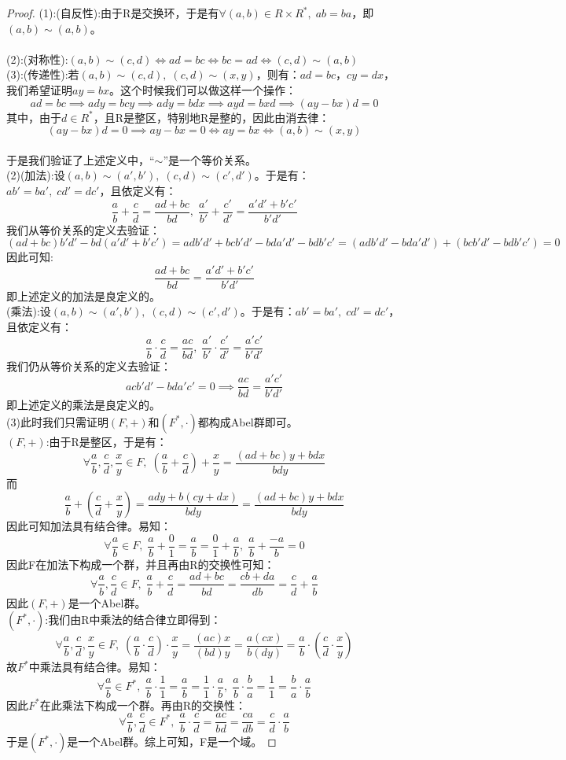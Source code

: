 \begin{proof}
(1):(自反性):由于R是交换环，于是有$\forall (a,b)\in R\times R^*,\; ab=ba$，即$(a,b)\sim (a,b)$。\\
\\
(2):(对称性):$(a,b)\sim (c,d)\iff ad=bc\iff bc=ad \iff (c,d)\sim (a,b)$\\
(3):(传递性):若$(a,b)\sim (c,d),\; (c,d)\sim (x,y)$，则有：$ad=bc$，$cy=dx$，我们希望证明$ay=bx$。这个时候我们可以做这样一个操作：
\[
ad=bc\implies ady=bcy\implies ady=bdx \implies ayd=bxd\implies (ay-bx)d=0
\]
其中，由于$d\in R^*$，且R是整区，特别地R是整的，因此由消去律：
\[
(ay-bx)d=0\implies ay-bx=0\iff ay=bx\iff (a,b)\sim(x,y)
\]
\\
于是我们验证了上述定义中，“$\sim$”是一个等价关系。\\
(2)(加法):设$(a,b)\sim (a',b'),\; (c,d)\sim (c',d')$。于是有：$ab'=ba',\; cd'=dc'$，且依定义有：
\[
\frac{a}{b}+\frac{c}{d}=\frac{ad+bc}{bd},\; \frac{a'}{b'}+\frac{c'}{d'}=\frac{a'd'+b'c'}{b'd'}
\]
我们从等价关系的定义去验证：
\[
(ad+bc)b'd'-bd(a'd'+b'c')=adb'd'+bcb'd'-bda'd'-bdb'c'=(adb'd'-bda'd')+(bcb'd'-bdb'c')=0
\]
因此可知:
\[
\frac{ad+bc}{bd}=\frac{a'd'+b'c'}{b'd'}
\]
即上述定义的加法是良定义的。\\
(乘法):设$(a,b)\sim (a',b'),\; (c,d)\sim (c',d')$。于是有：$ab'=ba',\; cd'=dc'$，且依定义有：
\[
\frac{a}{b}\cdot \frac{c}{d}=\frac{ac}{bd},\; \frac{a'}{b'}\cdot \frac{c'}{d'}=\frac{a'c'}{b'd'}
\]
我们仍从等价关系的定义去验证：
\[
acb'd'-bda'c'=0\implies \frac{ac}{bd}=\frac{a'c'}{b'd'}
\]
即上述定义的乘法是良定义的。\\
(3)此时我们只需证明$(F,+)$和$(F^*,\cdot)$都构成Abel群即可。\\
$(F,+)$:由于R是整区，于是有：
\[
\forall \frac{a}{b},\frac{c}{d},\frac{x}{y}\in F,\; (\frac{a}{b}+\frac{c}{d})+\frac{x}{y}=\frac{(ad+bc)y+bdx}{bdy}
\]
而
\[
\frac{a}{b}+(\frac{c}{d}+\frac{x}{y})=\frac{ady+b(cy+dx)}{bdy}=\frac{(ad+bc)y+bdx}{bdy}
\]
因此可知加法具有结合律。易知：
\[
\forall \frac{a}{b}\in F,\; \frac{a}{b}+\frac{0}{1}=\frac{a}{b}=\frac{0}{1}+\frac{a}{b},\; \frac{a}{b}+\frac{-a}{b}=0
\]
因此F在加法下构成一个群，并且再由R的交换性可知：
\[
\forall \frac{a}{b},\frac{c}{d}\in F,\; \frac{a}{b}+\frac{c}{d}=\frac{ad+bc}{bd}=\frac{cb+da}{db}=\frac{c}{d}+\frac{a}{b}
\]
因此$(F,+)$是一个Abel群。\\
$(F^*,\cdot)$:我们由R中乘法的结合律立即得到：
\[
\forall \frac{a}{b},\frac{c}{d},\frac{x}{y}\in F,\;(\frac{a}{b}\cdot\frac{c}{d})\cdot\frac{x}{y}=\frac{(ac)x}{(bd)y}=\frac{a(cx)}{b(dy)}=\frac{a}{b}\cdot (\frac{c}{d}\cdot \frac{x}{y})
\]
故$F^*$中乘法具有结合律。易知：
\[
\forall \frac{a}{b}\in F^*,\; \frac{a}{b}\cdot \frac{1}{1}=\frac{a}{b}=\frac{1}{1}\cdot\frac{a}{b},\; \frac{a}{b}\cdot \frac{b}{a}=\frac{1}{1}=\frac{b}{a}\cdot\frac{a}{b}
\]
因此$F^*$在此乘法下构成一个群。再由R的交换性：
\[
\forall \frac{a}{b},\frac{c}{d}\in F^*,\; \frac{a}{b}\cdot \frac{c}{d}=\frac{ac}{bd}=\frac{ca}{db}=\frac{c}{d}\cdot\frac{a}{b}
\]
于是$(F^*,\cdot)$是一个Abel群。综上可知，F是一个域。
\end{proof}
